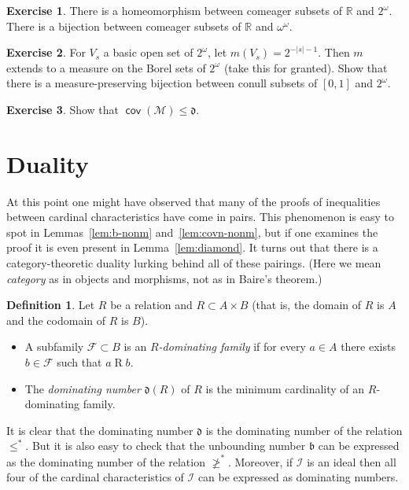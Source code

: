 \documentclass[11pt,oneside]{amsbook}
\newcommand{\RR}{\mathbb R}
\newcommand{\Meager}{\mathcal M}
\DeclareMathOperator{\cov}{\mathsf{cov}}
\theoremstyle{definition}
\newtheorem{exerc}{Exercise}[section]
\theoremstyle{plain}
\theoremstyle{definition}
\newtheorem{defn}[thm]{Definition}
\theoremstyle{remark}
\begin{document}
\begin{exerc}
  \label{exerc:meager-bij}
  There is a homeomorphism between comeager subsets of $\RR$ and $2^\omega$. There is a bijection between comeager subsets of $\RR$ and $\omega^\omega$.
\end{exerc}

\begin{exerc}
  \label{exerc:null-bij}
  For $V_s$ a basic open set of $2^\omega$, let $m(V_s)=2^{-|s|-1}$. Then $m$ extends to a measure on the Borel sets of $2^\omega$ (take this for granted). Show that there is a measure-preserving bijection between conull subsets of $[0,1]$ and $2^\omega$.
\end{exerc}

\begin{exerc}
  \label{exerc:covm-d}
  Show that $\cov(\Meager)\leq\mathfrak d$.
\end{exerc}



\section{Duality}

At this point one might have observed that many of the proofs of inequalities between cardinal characteristics have come in pairs. This phenomenon is easy to spot in Lemmas~\ref{lem:b-nonm} and~\ref{lem:covn-nonm}, but if one examines the proof it is even present in Lemma~\ref{lem:diamond}. It turns out that there is a category-theoretic duality lurking behind all of these pairings. (Here we mean \emph{category} as in objects and morphisms, not as in Baire's theorem.)

\begin{defn}
  Let $R$ be a relation and $R\subset A\times B$ (that is, the domain of $R$ is $A$ and the codomain of $R$ is $B$).
  \begin{itemize}
  \item A subfamily $\mathcal F\subset B$ is an \emph{$R$-dominating family} if for every $a\in A$ there exists $b\in\mathcal F$ such that $a\mathrel{R}b$.
  \item The \emph{dominating number} $\mathfrak d(R)$ of $R$ is the minimum cardinality of an $R$-dominating family.
  \end{itemize}
\end{defn}

It is clear that the dominating number $\mathfrak d$ is the dominating number of the relation $\leq^*$. But it is also easy to check that the unbounding number $\mathfrak b$ can be expressed as the dominating number of the relation $\not\geq^*$. Moreover, if $\mathcal I$ is an ideal then all four of the cardinal characteristics of $\mathcal I$ can be expressed as dominating numbers.
\end{document}
